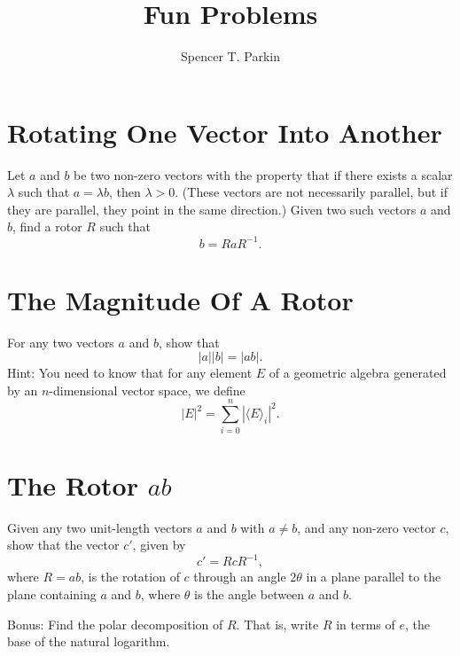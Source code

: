 \documentclass[12pt]{article}
\title{Fun Problems}
\author{Spencer T. Parkin}
\begin{document}
\maketitle

\section{Rotating One Vector Into Another}

Let $a$ and $b$ be two non-zero vectors with the property that if there
exists a scalar $\lambda$ such that $a=\lambda b$, then $\lambda>0$.
(These vectors are not necessarily parallel, but if they are parallel,
they point in the same direction.)  Given two such vectors $a$ and $b$,
find a rotor $R$ such that
\begin{equation}
b = RaR^{-1}.
\end{equation}

\section{The Magnitude Of A Rotor}

For any two vectors $a$ and $b$, show that
\begin{equation}
|a||b| = |ab|.
\end{equation}
Hint: You need to know that for any element $E$ of a geometric algebra generated
by an $n$-dimensional vector space, we define
\begin{equation}
|E|^2 = \sum_{i=0}^n|\langle E\rangle_i|^2.
\end{equation}

\section{The Rotor $ab$}

Given any two unit-length vectors $a$ and $b$ with $a\neq b$, and any non-zero
vector $c$, show that the vector $c'$, given by
\begin{equation}
c' = RcR^{-1},
\end{equation}
where $R=ab$, is the rotation of $c$ through an angle $2\theta$
in a plane parallel to the plane containing $a$ and $b$, where $\theta$
is the angle between $a$ and $b$.

Bonus: Find the polar decomposition of $R$.  That is, write $R$
in terms of $e$, the base of the natural logarithm.
\end{document}
